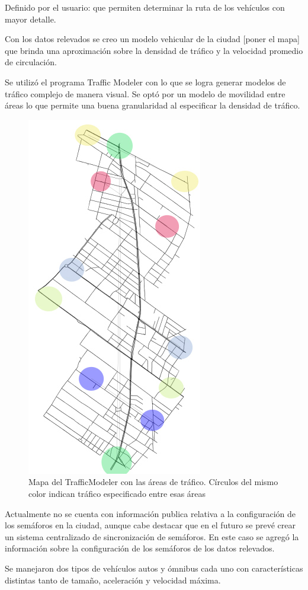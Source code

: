 Definido por el usuario: que permiten determinar la ruta de los vehículos con mayor detalle.



Con los datos relevados se creo un modelo vehicular de la ciudad [poner el mapa] que brinda una aproximación sobre la densidad de tráfico y la velocidad promedio de circulación.

Se utilizó el programa Traffic Modeler \citep{TrafficModeler} con lo que se logra generar modelos de tráfico complejo de manera visual. Se optó por un modelo de movilidad entre áreas lo que permite una buena granularidad al especificar la densidad de tráfico.


\begin{figure}[H]
	\centering
	\includegraphics[width=0.4\linewidth]{Figures/areaflow1}
	\caption{Mapa del TrafficModeler con las áreas de tráfico. Círculos del mismo color indican tráfico especificado entre esas áreas}
	\label{fig:areaflow1}
\end{figure}


Actualmente no se cuenta con información publica relativa a la configuración de los semáforos en la ciudad, aunque cabe destacar que en el futuro se prevé crear un sistema centralizado de sincronización de semáforos. \citep{OBS01} 
En este caso se agregó la información sobre la configuración de los semáforos de los datos relevados.

Se manejaron dos tipos de vehículos autos y ómnibus cada uno con características distintas tanto de tamaño, aceleración y velocidad máxima.

